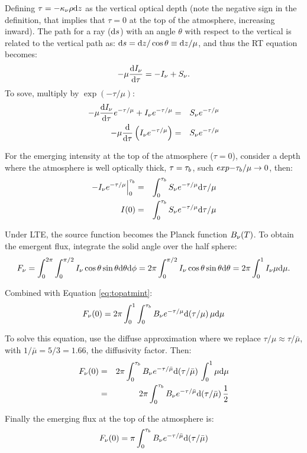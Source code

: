 \documentclass[letterpaper,12pt]{article}
\begin{document}
{Defining $\tau = -\kappa\sb{\nu} \rho \der z$ as the vertical optical
depth (note the negative sign in the definition, that implies that
$\tau=0$ at the top of the atmosphere, increasing inward).  The path
for a ray (${\rm d} s$) with an angle $\theta$ with respect to the
vertical is related to the vertical path as: ${\rm d} s = {\rm d}
z/\cos\theta \equiv {\rm d} z / \mu$, and thus the RT equation becomes:
\begin{equation}
-\mu\frac{\der I\sb{\nu}}{\der \tau} = - I\sb{\nu}  +  S\sb{\nu}.
\end{equation}
To sove, multiply by $\exp(-\tau/\mu)$:
\begin{eqnarray}
-\mu\frac{\der I\sb{\nu}}{\der \tau}e\sp{-\tau/\mu} + I\sb{\nu}e\sp{-\tau/\mu}  & = & S\sb{\nu}e\sp{-\tau/\mu} \\
-\mu\frac{\der}{\der \tau}\left( I\sb{\nu}e\sp{-\tau/\mu} \right)  & = & S\sb{\nu}e\sp{-\tau/\mu}
\end{eqnarray}

For the emerging intensity at the top of the atmosphere ($\tau=0$),
consider a depth where the atmosphere is well optically thick,
$\tau=\tau\sb{b}$, such $exp{-\tau\sb{b}/\mu} \to 0$, then:
\begin{eqnarray}
\Eval{-I\sb{\nu}e\sp{-\tau/\mu}}{0}{\tau\sb{b}}  & = &
     \int\sb{0}\sp{\tau\sb{b}}S\sb{\nu}e\sp{-\tau/\mu}\der\tau/\mu \\
I(0)  & = &
     \int\sb{0}\sp{\tau\sb{b}}S\sb{\nu}e\sp{-\tau/\mu}\der\tau/\mu
\label{eq:topatmint}
\end{eqnarray}

Under LTE, the source function becomes the Planck function $B\sb{\nu}(T)$.
To obtain the emergent flux, integrate the solid angle over the half sphere:
\begin{equation}
F\sb{\nu} =      \int\sb{0}\sp{2\pi}\int\sb{0}\sp{\pi/2} I\sb{\nu} \cos\theta\sin\theta \der\theta \der\phi 
          = 2\pi \int\sb{0}\sp{\pi/2} I\sb{\nu} \cos\theta\sin\theta \der\theta
          = 2\pi \int\sb{0}\sp{1}     I\sb{\nu} \mu\der\mu.
\end{equation}

Combined with Equation \ref{eq:topatmint}:
\begin{equation}
F\sb{\nu}(0) = 2\pi \int\sb{0}\sp{1} \int\sb{0}\sp{\tau\sb{b}} B\sb{\nu}e\sp{-\tau/\mu}\der(\tau/\mu)\, \mu\der\mu
\end{equation}

To solve this equation, use the diffuse approximation where we
replace $\tau/\mu \approx \tau/\bar{\mu}$, with $1/\bar{\mu} = 5/3 =
1.66$, the diffusivity factor.  Then:
\begin{eqnarray}
F\sb{\nu}(0) & = & 2\pi \int\sb{0}\sp{\tau\sb{b}} B\sb{\nu}e\sp{-\tau/\bar{\mu}}\der(\tau/\bar{\mu})\, \int\sb{0}\sp{1}\mu\der\mu \\
             & = & 2\pi \int\sb{0}\sp{\tau\sb{b}} B\sb{\nu}e\sp{-\tau/\bar{\mu}}\der(\tau/\bar{\mu})\, \frac{1}{2}
\end{eqnarray}

Finally the emerging flux at the top of the atmosphere is:
\begin{equation}
F\sb{\nu}(0) = \pi \int\sb{0}\sp{\tau\sb{b}} B\sb{\nu}e\sp{-\tau/\bar{\mu}}\der(\tau/\bar{\mu})
\end{equation}
}
\end{document}

